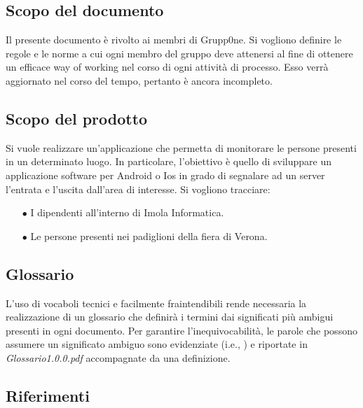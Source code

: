 \documentclass[../norme-di-progetto.tex]{subfiles}
\begin{document}
\subsection{Scopo del documento}
\label{sub:scopo del documento}
Il presente documento è rivolto ai membri di Grupp0ne. Si vogliono definire le regole e le norme a cui ogni membro del gruppo deve attenersi al fine di ottenere un efficace way of working nel corso di ogni attività di processo. Esso verrà aggiornato nel corso del tempo, pertanto è ancora incompleto. 


\subsection{Scopo del prodotto}
\label{sub:scopo del prodotto}
Si vuole realizzare un'applicazione che permetta di monitorare le persone presenti in un determinato luogo. In particolare, l'obiettivo è quello di sviluppare un applicazione software per Android o Ios in grado di segnalare ad un server l'entrata e l'uscita dall'area di interesse.
Si vogliono tracciare:
\begin{itemize}
	\item[$\bullet$]  I dipendenti all'interno di Imola Informatica.
	\item[$\bullet$] Le persone presenti nei padiglioni della fiera di Verona.
\end{itemize}

\subsection{Glossario}
\label{sub:glossario}
L'uso di vocaboli tecnici e facilmente fraintendibili rende necessaria la realizzazione di un glossario che definirà i termini dai significati più ambigui presenti in ogni documento. Per garantire l'inequivocabilità, le parole che possono assumere un significato ambiguo sono evidenziate (i.e., ) e riportate in \textit{Glossario1.0.0.pdf} accompagnate da una definizione.

\subsection{Riferimenti}
\label{sub:riferimenti}
\end{document}
